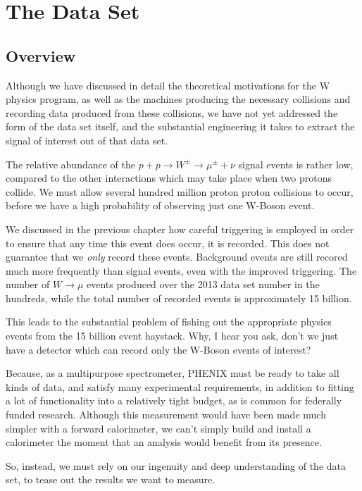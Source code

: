 \chapter{The Data Set}
\label{ch:data_collection}
\section{Overview}
Although we have discussed in detail the theoretical motivations for the W
physics program, as well as the machines producing the necessary collisions and
recording data produced from these collisions, we have not yet addressed the
form of the data set itself, and the substantial engineering it takes to extract
the signal of interest out of that data set.


The relative abundance of the $p + p \rightarrow W^\pm \rightarrow \mu^\pm +
\nu$ signal events is rather low, compared to the other interactions which may
take place when two protons collide. We must allow several hundred million
proton proton collisions to occur, before we have a high probability of
observing just one W-Boson event. 

We discussed in the previous chapter how careful triggering is employed in order
to ensure that any time this event does occur, it is recorded. This does not
guarantee that we \textit{only} record these events. Background events are still
recored much more frequently than signal events, even with the improved
triggering. The number of $W\rightarrow\mu$ events produced over the 2013 data
set number in the hundreds, while the total number of recorded events is
approximately 15 billion.

This leads to the substantial problem of fishing out the appropriate physics
events from the 15 billion event haystack. Why, I hear you ask, don't we just
have a detector which can record only the W-Boson events of interest?

Because, as a multipurpose spectrometer, PHENIX must be ready to take
all kinds of data, and satisfy many experimental requirements, in addition to
fitting a lot of functionality into a relatively tight budget, as is common for
federally funded research. Although this measurement would have been made
much simpler with a forward calorimeter, we can't simply build and install a
calorimeter the moment that an analysis would benefit from its presence.

So, instead, we must rely on our ingenuity and deep understanding of the data
set, to tease out the results we want to measure.

